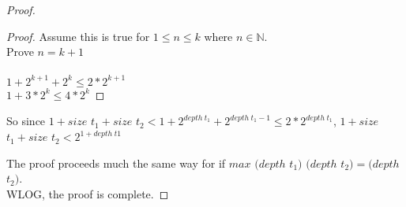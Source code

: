 \documentclass[paper=a4, fontsize=11pt]{scrartcl} %
\numberwithin{equation}{section} %
\numberwithin{figure}{section} %
\numberwithin{table}{section} %
\begin{document}
\begin{proof}
\begin{proof}
 Assume this is true for $1 \leq n \leq k$ where $n \in \mathbb{N}$.\\
 Prove $n = k + 1$\\
\\
 $1 + 2^{k+1} + 2^k \leq 2*2^{k+1}$\\
 $1 + 3*2^k \leq 4*2^k$
            
\end{proof} 

 So since $1 + size$ $t_1 + size$ $t_2 < 1 + 2^{depth \hspace{3pt} t_1} + 2^{depth\hspace{3pt} t_1 - 1} \leq 2 * 2^{depth\hspace{3pt} t_1}$, $1 + size$ $t_1 + size$ $t_2 < 2^{1 + depth \hspace{3pt} t1}$

The proof proceeds much the same way for if $max$ $(depth$ $t_1)$ $(depth$ $t_2) = (depth$ $t_2)$.\\

WLOG, the proof is complete.
\end{proof}
\end{document}
